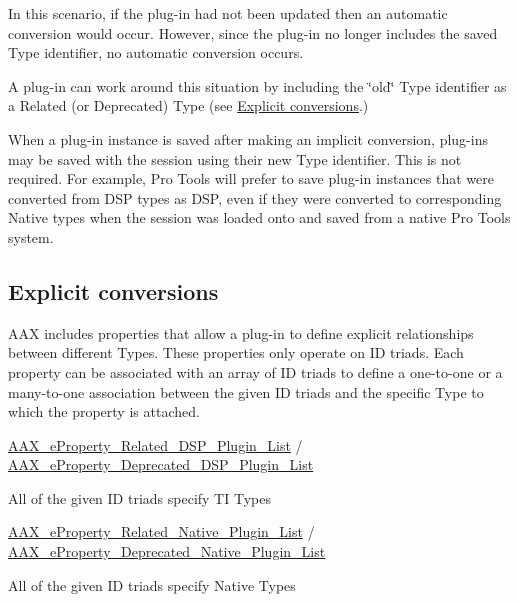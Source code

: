 In this scenario, if the plug-\/in had not been updated then an automatic conversion would occur. However, since the plug-\/in no longer includes the saved Type identifier, no automatic conversion occurs.

A plug-\/in can work around this situation by including the \char`\"{}old\char`\"{} Type identifier as a Related (or Deprecated) Type (see \hyperlink{a00356_advancedTopics_relatedTypes_explicitconversions}{Explicit conversions}.)

When a plug-\/in instance is saved after making an implicit conversion, plug-\/ins may be saved with the session using their new Type identifier. This is not required. For example, Pro Tools will prefer to save plug-\/in instances that were converted from D\+S\+P types as D\+S\+P, even if they were converted to corresponding Native types when the session was loaded onto and saved from a native Pro Tools system.\hypertarget{a00356_advancedTopics_relatedTypes_explicitconversions}{}\subsection{Explicit conversions}\label{a00356_advancedTopics_relatedTypes_explicitconversions}
A\+A\+X includes properties that allow a plug-\/in to define explicit relationships between different Types. These properties only operate on I\+D triads. Each property can be associated with an array of I\+D triads to define a one-\/to-\/one or a many-\/to-\/one association between the given I\+D triads and the specific Type to which the property is attached. 
\begin{DoxyItemize}
\item \hyperlink{a00283_a6571f4e41a5dd06e4067249228e2249ea9dc35184d705e963f14f85df4d71193d}{A\+A\+X\+\_\+e\+Property\+\_\+\+Related\+\_\+\+D\+S\+P\+\_\+\+Plugin\+\_\+\+List} / \hyperlink{a00283_a6571f4e41a5dd06e4067249228e2249eab102bc794f2770c14b1f0fe2dde6766a}{A\+A\+X\+\_\+e\+Property\+\_\+\+Deprecated\+\_\+\+D\+S\+P\+\_\+\+Plugin\+\_\+\+List} 
\begin{DoxyItemize}
\item All of the given I\+D triads specify T\+I Types  
\end{DoxyItemize}
\item \hyperlink{a00283_a6571f4e41a5dd06e4067249228e2249eae47f50370ae2f6bf29b8cacc6a41d924}{A\+A\+X\+\_\+e\+Property\+\_\+\+Related\+\_\+\+Native\+\_\+\+Plugin\+\_\+\+List} / \hyperlink{a00283_a6571f4e41a5dd06e4067249228e2249ea3f1e690c987d601001a7cc1da8247399}{A\+A\+X\+\_\+e\+Property\+\_\+\+Deprecated\+\_\+\+Native\+\_\+\+Plugin\+\_\+\+List} 
\begin{DoxyItemize}
\item All of the given I\+D triads specify Native Types  
\end{DoxyItemize}
\end{DoxyItemize}

